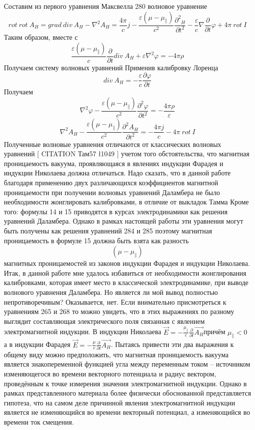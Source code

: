 \documentclass[11pt]{article}
\begin{document}
Составим из первого уравнения Максвелла 280 волновое уравнение
\[rot\ rot\ {{A}_{H}}=grad\ div\ {{A}_{H}}-{{\nabla }^{2}}{{A}_{H}}=\frac{4\pi }{c}j-\frac{\varepsilon \left( \mu -{{\mu }_{\parallel }} \right)}{{{c}^{2}}}\frac{{{\partial }^{2}}{{}_{H}}}{\partial {{t}^{2}}}-\frac{\varepsilon }{c}\nabla \frac{\partial }{\partial t}\varphi +4\pi \ rot\ I\]
Таким образом, вместе с
\[\frac{\varepsilon \left( \mu -{{\mu }_{\parallel }} \right)}{c}\frac{\partial }{\partial t}div\ {{A}_{H}}+\varepsilon {{\nabla }^{2}}\varphi =-4\pi \rho \]
Получаем систему волновых уравнений Применив калибровку Лоренца
\[div\ {{A}_{H}}=-\frac{\varepsilon }{c}\frac{\partial \varphi }{\partial t}\]
Получаем
\[{{\nabla }^{2}}\varphi -\frac{\varepsilon \left( \mu -{{\mu }_{\parallel }} \right)}{{{c}^{2}}}\frac{{{\partial }^{2}}\varphi }{\partial {{t}^{2}}}=-\frac{4\pi \rho }{\varepsilon }\]
\[{{\nabla }^{2}}{{A}_{H}}-\frac{\varepsilon \left( \mu -{{\mu }_{\parallel }} \right)}{{{c}^{2}}}\frac{{{\partial }^{2}}{{A}_{H}}}{\partial {{t}^{2}}}=-\frac{4\pi j}{c}-4\pi \ rot\ I\]
Полученные волновые уравнения отличаются от классических волновых
уравнений {[} CITATION Там57 \l 1049 {]} учетом того обстоятельства, что
магнитная проницаемость вакуума, проявляющаяся в явлениях индукции
Фарадея и индукции Николаева должна отличаться. Надо сказать, что в
данной работе благодаря применению двух различающихся коэффициентов
магнитной проницаемости при получении волновых уравнений Даламбера не
было необходимости жонглировать калибровками, в отличие от выкладок
Тамма Кроме того: формулы 14 и 15 приводятся в курсах электродинамики
как решения уравнений Даламбера. Однако в рамках настоящей работы эти
уравнения могут быть получены как решения уравнений 284 и 285 поэтому
магнитная проницаемость в формуле 15 должна быть взята как разность
\[\left( \mu -{{\mu }_{\parallel }} \right)\]магнитных проницаемостей из
законов индукции Фарадея и индукции Николаева. Итак, в данной работе мне
удалось избавиться от необходимости жонглирования калибровками, которая
имеет место в классической электродинамике, при выводе волнового
уравнения Даламбера. Но является ли мой вывод полностью
непротиворечивым? Оказывается, нет. Если внимательно присмотреться к
уравнениям 265 и 268 то можно увидеть, что в этих выражениях по разному
выглядит составляющая электрического поля связанная с явлением
электромагнитной индукции. В индукции Николаева
\(\overrightarrow{E}=-\frac{{{\mu }_{\parallel }}}{c}\frac{\partial }{\partial t}\overrightarrow{{{A}_{H}}}\)причём
\({{\mu }_{\parallel }}<0\) а в индукции Фарадея
\(\overrightarrow{E}=-\frac{\mu }{c}\frac{\partial }{\partial t}\overrightarrow{{{A}_{H}}}\).
Пытаясь привести эти два выражения к общему виду можно предположить, что
магнитная проницаемость вакуума является знакопеременной функцией угла
между переменным током -- источником изменяющегося во времени векторного
потенциала и радиус вектором, проведённым к точке измерения значения
электромагнитной индукции. Однако в рамках представленного материала
более физически обоснованной представляется гипотеза, что на самом деле
причинной явления электромагнитной индукции является не изменяющийся во
времени векторный потенциал, а изменяющийся во времени ток смещения.
\end{document}
